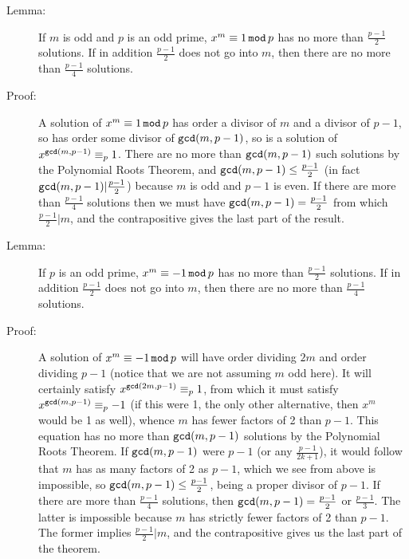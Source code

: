 \documentclass[12pt]{article}
\begin{document}
\begin{description}

\item[Lemma:]  If $m$ is odd and $p$ is an odd prime, $x^m \equiv 1 \,{\tt mod} \,p$ has no more than $\frac{p-1}2$ solutions.  If in addition $\frac{p-1}2$ does not go into $m$, then there are no more than $\frac{p-1}4$ solutions.

\item[Proof:]    A solution of $x^m \equiv 1 \,{\tt mod} \,p$ has order a divisor of $m$ and a divisor of $p-1$, so has order some divisor of ${\tt gcd}(m,p-1)$, so is a solution of
$x^{{\tt gcd}(m,p-1)}\equiv_p 1$.   There are no more than ${\tt gcd}(m,p-1)$ such solutions by the Polynomial Roots Theorem, and  ${\tt gcd}(m,p-1)\leq \frac{p-1}2$ (in fact ${\tt gcd}(m,p-1)| \frac{p-1}2$) because $m$ is odd and $p-1$ is even.  If there are more than $\frac{p-1}4$ solutions then we must have  ${\tt gcd}(m,p-1)=\frac{p-1}2$ from which $\frac{p-1}2|m$, and the contrapositive gives the last part of the result.

\item[Lemma:]  If $p$ is an odd prime, $x^m \equiv -1 \,{\tt mod} \,p$ has no more than $\frac{p-1}2$ solutions.   If in addition $\frac{p-1}2$ does not go into $m$, then there are no more than $\frac{p-1}4$ solutions.

\item[Proof:]    A solution of $x^m \equiv -1 \,{\tt mod} \,p$ will have order dividing $2m$ and order dividing $p-1$ (notice that we are not assuming $m$ odd here).  It will certainly satisfy $x^{{\tt gcd}(2m,p-1)}\equiv_p1$, from which it must
satisfy $x^{{\tt gcd}(m,p-1)}\equiv_p-1$ (if this were 1, the only other alternative, then $x^m$ would be 1 as well), whence $m$ has fewer factors of 2 than $p-1$.  This equation has no more than ${\tt gcd}(m,p-1)$  solutions by the Polynomial Roots Theorem.  If ${\tt gcd}(m,p-1)$ were $p-1$ (or any $\frac{p-1}{2k+1}$), it would follow that $m$ has as many factors of 2 as $p-1$, which we see from above is impossible, so ${\tt gcd}(m,p-1) \leq \frac{p-1}2$, being a proper divisor of $p-1$.  If there are more than $\frac{p-1}4$ solutions, then ${\tt gcd}(m,p-1) = \frac{p-1}2$ or $\frac{p-1}3$.   The latter is impossible because $m$ has strictly fewer factors of 2 than $p-1$.  The former implies $\frac{p-1}2 | m$, and the contrapositive gives us the last part of the theorem.


\end{description}
\end{document}
